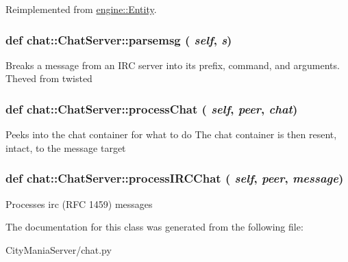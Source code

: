 Reimplemented from \hyperlink{classengine_1_1Entity}{engine::Entity}.\hypertarget{classchat_1_1ChatServer_a2608f0b49950c686ee1c1ffc17e4ddfd}{
\subsubsection[{parsemsg}]{\setlength{\rightskip}{0pt plus 5cm}def chat::ChatServer::parsemsg ( {\em self}, \/   {\em s})}}
\label{classchat_1_1ChatServer_a2608f0b49950c686ee1c1ffc17e4ddfd}
\begin{DoxyVerb}
Breaks a message from an IRC server into its prefix, command, and arguments.
Theved from twisted
\end{DoxyVerb}
 \hypertarget{classchat_1_1ChatServer_a7f0db34ae9aae25478664ce7395b11f3}{
\subsubsection[{processChat}]{\setlength{\rightskip}{0pt plus 5cm}def chat::ChatServer::processChat ( {\em self}, \/   {\em peer}, \/   {\em chat})}}
\label{classchat_1_1ChatServer_a7f0db34ae9aae25478664ce7395b11f3}
\begin{DoxyVerb}
Peeks into the chat container for what to do
The chat container is then resent, intact,
to the message target
\end{DoxyVerb}
 \hypertarget{classchat_1_1ChatServer_a3155b5a8e4933d9dffbfdd7ccdc5c162}{
\subsubsection[{processIRCChat}]{\setlength{\rightskip}{0pt plus 5cm}def chat::ChatServer::processIRCChat ( {\em self}, \/   {\em peer}, \/   {\em message})}}
\label{classchat_1_1ChatServer_a3155b5a8e4933d9dffbfdd7ccdc5c162}
\begin{DoxyVerb}
Processes irc (RFC 1459) messages
\end{DoxyVerb}
 

The documentation for this class was generated from the following file:\begin{DoxyCompactItemize}
\item 
CityManiaServer/chat.py\end{DoxyCompactItemize}
